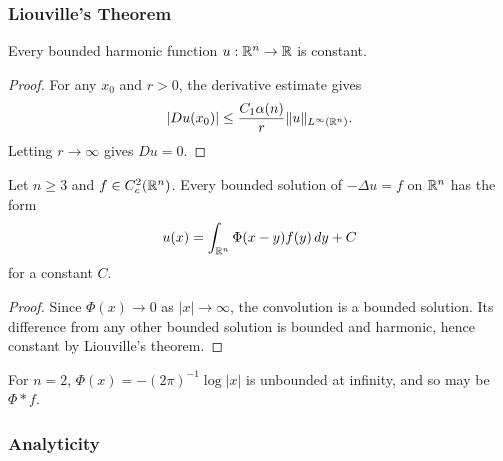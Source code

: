 \subsubsection{Liouville's Theorem}
\label{sec:laplace-liouvilles-theorem}

\begin{theorem}
\label{thm:liouville-theorem-harmonic}



Every bounded harmonic function $u:\mathbb{R}^n\to\mathbb{R}$ is constant.
\end{theorem}
\begin{proof}
\sketch For any $x_0$ and $r>0$, the derivative estimate gives
$$|Du(x_0)|\le\frac{C_1\alpha(n)}r\|u\|_{L^\infty(\mathbb{R}^n)}.$$
Letting $r\to\infty$ gives $Du=0$.
\end{proof}

\begin{theorem}
\label{thm:representation-formula-bounded-solutions}

Let $n\ge3$ and $f\in C_c^2(\mathbb{R}^n)$. Every bounded solution of
$-\Delta u=f$ on $\mathbb{R}^n$ has the form
$$u(x)=\int_{\mathbb{R}^n}\Phi(x-y)f(y)\,dy+C$$
for a constant $C$.
\end{theorem}
\begin{proof}
\sketch Since $\Phi(x)\to0$ as $|x|\to\infty$, the convolution is a bounded
solution. Its difference from any other bounded solution is bounded and
harmonic, hence constant by Liouville's theorem.
\end{proof}

\begin{remark}
\label{rem:representation-formula-n2-unbounded}

For $n=2$, $\Phi(x)=-(2\pi)^{-1}\log|x|$ is unbounded at infinity, and so may
be $\Phi*f$.
\end{remark}

\subsubsection{Analyticity}
\label{sec:laplace-analyticity}

